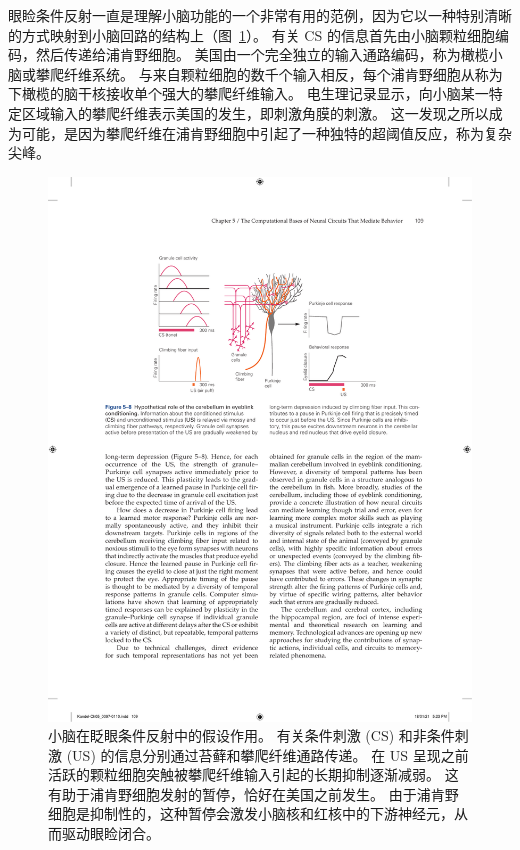 眼睑条件反射一直是理解小脑功能的一个非常有用的范例，因为它以一种特别清晰的方式映射到小脑回路的结构上（图~\ref{fig:5_8}）。 
有关 CS 的信息首先由小脑颗粒细胞编码，然后传递给浦肯野细胞。
美国由一个完全独立的输入通路编码，称为橄榄小脑或攀爬纤维系统。
与来自颗粒细胞的数千个输入相反，每个浦肯野细胞从称为下橄榄的脑干核接收单个强大的攀爬纤维输入。
电生理记录显示，向小脑某一特定区域输入的攀爬纤维表示美国的发生，即刺激角膜的刺激。
这一发现之所以成为可能，是因为攀爬纤维在浦肯野细胞中引起了一种独特的超阈值反应，称为复杂尖峰。


\begin{figure}[htbp]
	\centering
	\includegraphics[width=1.0\linewidth]{chap05/fig_5_8}
	\caption{小脑在眨眼条件反射中的假设作用。 
		有关条件刺激 (CS) 和非条件刺激 (US) 的信息分别通过苔藓和攀爬纤维通路传递。 
		在 US 呈现之前活跃的颗粒细胞突触被攀爬纤维输入引起的长期抑制逐渐减弱。 
		这有助于浦肯野细胞发射的暂停，恰好在美国之前发生。 
		由于浦肯野细胞是抑制性的，这种暂停会激发小脑核和红核中的下游神经元，从而驱动眼睑闭合。}
	\label{fig:5_8}
\end{figure}


